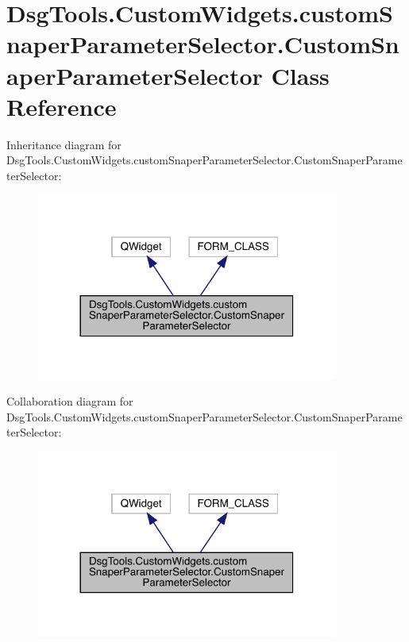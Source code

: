 \hypertarget{class_dsg_tools_1_1_custom_widgets_1_1custom_snaper_parameter_selector_1_1_custom_snaper_parameter_selector}{}\section{Dsg\+Tools.\+Custom\+Widgets.\+custom\+Snaper\+Parameter\+Selector.\+Custom\+Snaper\+Parameter\+Selector Class Reference}
\label{class_dsg_tools_1_1_custom_widgets_1_1custom_snaper_parameter_selector_1_1_custom_snaper_parameter_selector}


Inheritance diagram for Dsg\+Tools.\+Custom\+Widgets.\+custom\+Snaper\+Parameter\+Selector.\+Custom\+Snaper\+Parameter\+Selector\+:
\nopagebreak
\begin{figure}[H]
\begin{center}
\leavevmode
\includegraphics[width=281pt]{class_dsg_tools_1_1_custom_widgets_1_1custom_snaper_parameter_selector_1_1_custom_snaper_parameter_selector__inherit__graph}
\end{center}
\end{figure}


Collaboration diagram for Dsg\+Tools.\+Custom\+Widgets.\+custom\+Snaper\+Parameter\+Selector.\+Custom\+Snaper\+Parameter\+Selector\+:
\nopagebreak
\begin{figure}[H]
\begin{center}
\leavevmode
\includegraphics[width=281pt]{class_dsg_tools_1_1_custom_widgets_1_1custom_snaper_parameter_selector_1_1_custom_snaper_parameter_selector__coll__graph}
\end{center}
\end{figure}
